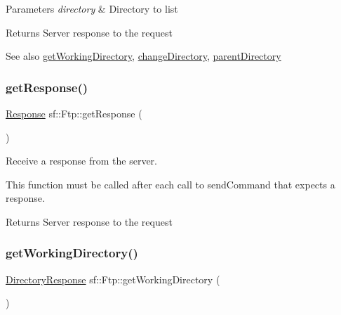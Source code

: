 \begin{DoxyParams}{Parameters}
{\em directory} & Directory to list\\
\hline
\end{DoxyParams}
\begin{DoxyReturn}{Returns}
Server response to the request
\end{DoxyReturn}
\begin{DoxySeeAlso}{See also}
\mbox{\hyperlink{classsf_1_1_ftp_a79c654fcdd0c81e68c4fa29af3b45e0c}{get\+Working\+Directory}}, \mbox{\hyperlink{classsf_1_1_ftp_a7e93488ea6330dd4dd76e428da9bb6d3}{change\+Directory}}, \mbox{\hyperlink{classsf_1_1_ftp_ad295cf77f30f9ad07b5c401fd9849189}{parent\+Directory}} \begin{DoxyVerb}\end{DoxyVerb}
 
\end{DoxySeeAlso}
\mbox{\label{classsf_1_1_ftp_a605a3ecae3bbba58fd1f250be500e741}} 
\subsubsection{\texorpdfstring{getResponse()}{getResponse()}}
{\footnotesize\ttfamily \mbox{\hyperlink{classsf_1_1_ftp_1_1_response}{Response}} sf\+::\+Ftp\+::get\+Response (\begin{DoxyParamCaption}{ }\end{DoxyParamCaption})\hspace{0.3cm}{\ttfamily [private]}}



Receive a response from the server. 

This function must be called after each call to send\+Command that expects a response.

\begin{DoxyReturn}{Returns}
Server response to the request \begin{DoxyVerb}\end{DoxyVerb}
 
\end{DoxyReturn}
\mbox{\label{classsf_1_1_ftp_a79c654fcdd0c81e68c4fa29af3b45e0c}} 
\subsubsection{\texorpdfstring{getWorkingDirectory()}{getWorkingDirectory()}}
{\footnotesize\ttfamily \mbox{\hyperlink{classsf_1_1_ftp_1_1_directory_response}{Directory\+Response}} sf\+::\+Ftp\+::get\+Working\+Directory (\begin{DoxyParamCaption}{ }\end{DoxyParamCaption})}



